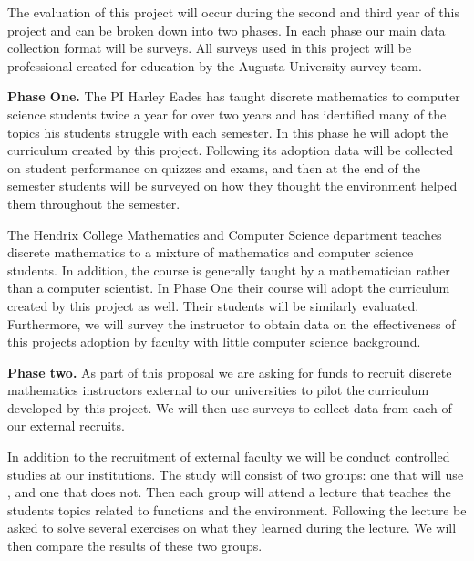 The evaluation of this project will occur during the second and third
year of this project and can be broken down into two phases.  In each
phase our main data collection format will be surveys.  All surveys
used in this project will be professional created for education by the
Augusta University survey team.

\textbf{Phase One.} The PI Harley Eades has taught discrete
mathematics to computer science students twice a year for over two
years and has identified many of the topics his students struggle with
each semester.  In this phase he will adopt the curriculum created by
this project.  Following its adoption data will be collected on
student performance on quizzes and exams, and then at the end of the
semester students will be surveyed on how they thought the \thelang{}
environment helped them throughout the semester.

The Hendrix College Mathematics and Computer Science department
teaches discrete mathematics to a mixture of mathematics and computer
science students.  In addition, the course is generally taught by a
mathematician rather than a computer scientist.  In Phase One their
course will adopt the curriculum created by this project as well.
Their students will be similarly evaluated.  Furthermore, we will
survey the instructor to obtain data on the effectiveness of this
projects adoption by faculty with little computer science background.

\textbf{Phase two.} As part of this proposal we are asking for funds
to recruit discrete mathematics instructors external to our
universities to pilot the curriculum developed by this project. We
will then use surveys to collect data from each of our external
recruits.

In addition to the recruitment of external faculty we will be conduct
controlled studies at our institutions.  The study will consist of two
groups: one that will use \thelang{}, and one that does not.  Then
each group will attend a lecture that teaches the students topics
related to functions and the \thelang{} environment.  Following the
lecture be asked to solve several exercises on what they learned
during the lecture.  We will then compare the results of these two
groups.  
